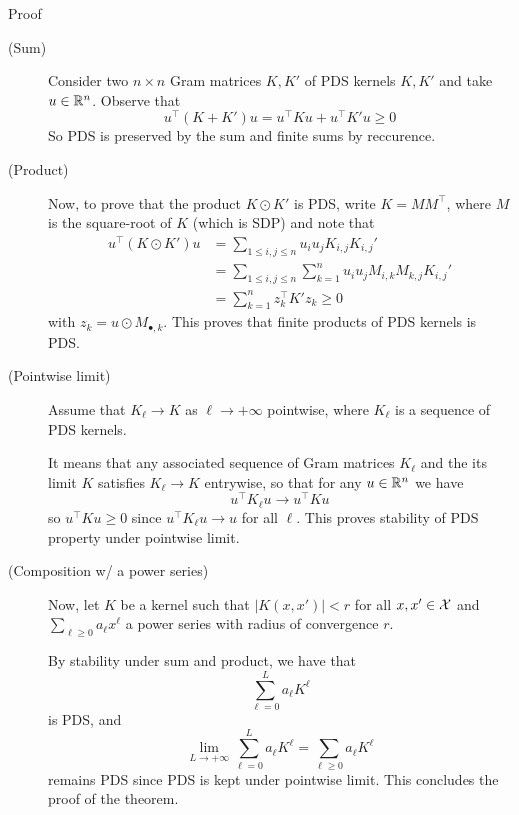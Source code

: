 \documentclass[xcolor={usenames,dvipsnames}]{beamer}
\begin{document}
\begin{frame}[allowframebreaks]{Proof}
\begin{description}
\item[(Sum)]  Consider two $n \times n$ Gram matrices $K, K'$ of PDS kernels $K, K'$ and take $u \in \mathbb{R}^n$. Observe that
  \begin{equation*}
    u^\top (K + K') u = u^\top K u + u^\top K' u \geq 0
  \end{equation*}
  So PDS is preserved by the sum and finite sums by reccurence.

\item[(Product)] Now, to prove that the product $K \odot K'$ is PDS, write $K = M M^\top$, where $M$ is the square-root of $K$ (which is SDP) and note that
  \begin{align*}
    u^\top (K \odot K') u &= \sum_{1 \leq i, j \leq n} u_i u_j K_{i, j} 
     K_{i, j}' \\
     &= \sum_{1 \leq i, j \leq n} \sum_{k=1}^n u_i u_j M_{i, k} M_{k, j} K_{i, j}' \\
     &= \sum_{k=1}^n z_k^\top K' z_k \geq 0
  \end{align*}
  with $z_k = u \odot M_{\bullet, k}$. 
  This proves that finite products of PDS kernels is PDS.

\item[(Pointwise limit)] Assume that $K_\ell \rightarrow K$ as $\ell \rightarrow +\infty$ pointwise, where $K_\ell$
  is a sequence of PDS kernels. 

  It means that any associated sequence of Gram matrices $K_\ell$ and the its 
  limit $K$ satisfies $K_\ell \rightarrow K$ entrywise, so that for any
   $u \in \mathbb{R}^n$ we have
  \begin{equation*}
    u^\top K_\ell u \rightarrow u^\top K u
  \end{equation*}
  so $u^\top K u \geq 0$ since $u^\top K_\ell u \rightarrow u$ for all $\ell$.  
  This proves stability of PDS property under pointwise limit.
  
   \item[(Composition w/ a power series)] Now, let $K$ be a kernel such that $|K(x, x')| < r$ for all $x, x' \in {\mathcal{X}}$ and $\sum_{\ell \geq 0} a_\ell x^\ell$ a power series with radius of convergence $r$.


 By stability under sum and product, we have that
  \begin{equation*}
    \sum_{\ell=0}^L a_\ell K^\ell
  \end{equation*}
  is PDS, and 
  \begin{equation*}
    \lim_{L \rightarrow +\infty} \sum_{\ell=0}^L a_\ell K^\ell = 
    \sum_{\ell \geq 0} a_\ell K^\ell
  \end{equation*}
  remains PDS since PDS is kept under pointwise limit.
  This concludes the proof of the theorem.
\end{description}
\end{frame}
\end{document}
